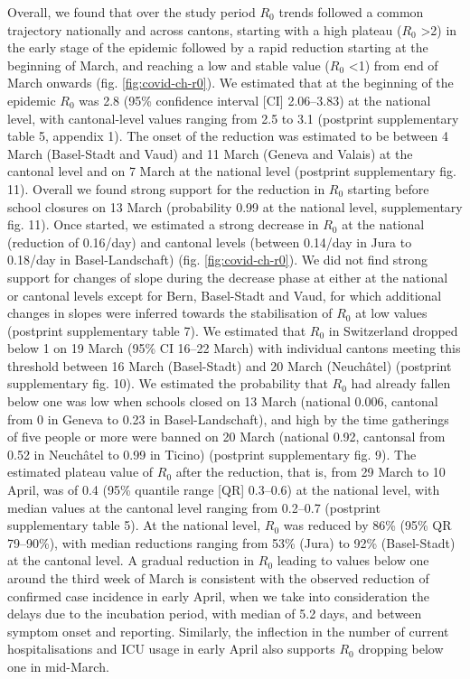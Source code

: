 Overall, we found that over the study period $R_0$ trends followed a common trajectory nationally and across cantons, starting with a high plateau ($R_0$ >2) in the early stage of the epidemic followed by a rapid reduction starting at the beginning of March, and reaching a low and stable value ($R_0$ <1) from end of March onwards (fig. \ref{fig:covid-ch-r0}). We estimated that at the beginning of the epidemic $R_0$ was 2.8 (95\% confidence interval [CI] 2.06–3.83) at the national level, with cantonal-level values ranging from 2.5 to 3.1 (postprint supplementary table 5, appendix 1). The onset of the reduction was estimated to be between 4 March (Basel-Stadt and Vaud) and 11 March (Geneva and Valais) at the cantonal level and on 7 March at the national level (postprint supplementary fig. 11). Overall we found strong support for the reduction in $R_0$ starting before school closures on 13 March (probability 0.99 at the national level, supplementary fig. 11). Once started, we estimated a strong decrease in $R_0$ at the national (reduction of 0.16/day) and cantonal levels (between 0.14/day in Jura to 0.18/day in Basel-Landschaft) (fig. \ref{fig:covid-ch-r0}). We did not find strong support for changes of slope during the decrease phase at either at the national or cantonal levels except for Bern, Basel-Stadt and Vaud, for which additional changes in slopes were inferred towards the stabilisation of $R_0$ at low values (postprint supplementary table 7). We estimated that $R_0$ in Switzerland dropped below 1 on 19 March (95\% CI 16–22 March) with individual cantons meeting this threshold between 16 March (Basel-Stadt) and 20 March (Neuchâtel) (postprint supplementary fig. 10). We estimated the probability that $R_0$ had already fallen below one was low when schools closed on 13 March (national 0.006, cantonal from 0 in Geneva to 0.23 in Basel-Landschaft), and high by the time gatherings of five people or more were banned on 20 March (national 0.92, cantonsal from 0.52 in Neuchâtel to 0.99 in Ticino) (postprint supplementary fig. 9). The estimated plateau value of $R_0$ after the reduction, that is, from 29 March to 10 April, was of 0.4 (95\% quantile range [QR] 0.3–0.6) at the national level, with median values at the cantonal level ranging from 0.2–0.7 (postprint supplementary table 5). At the national level, $R_0$ was reduced by 86\% (95\% QR 79–90\%), with median reductions ranging from 53\% (Jura) to 92\% (Basel-Stadt) at the cantonal level. A gradual reduction in $R_0$ leading to values below one around the third week of March is consistent with the observed reduction of confirmed case incidence in early April, when we take into consideration the delays due to the incubation period, with median of 5.2 days\cite{Lauer:IncubationPeriodCoronavirus:2020}, and between symptom onset and reporting\cite{Bi:EpidemiologyTransmissionCOVID19:2020}. Similarly, the inflection in the number of current hospitalisations and ICU usage in early April also supports $R_0$ dropping below one in mid-March. 
